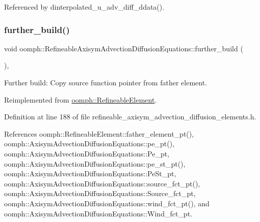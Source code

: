 Referenced by dinterpolated\+\_\+u\+\_\+adv\+\_\+diff\+\_\+ddata().

\mbox{\label{classoomph_1_1RefineableAxisymAdvectionDiffusionEquations_aefeb49794d8a5d79e59c9d2145e60795}} 
\subsubsection{\texorpdfstring{further\+\_\+build()}{further\_build()}}
{\footnotesize\ttfamily void oomph\+::\+Refineable\+Axisym\+Advection\+Diffusion\+Equations\+::further\+\_\+build (\begin{DoxyParamCaption}{ }\end{DoxyParamCaption})\hspace{0.3cm}{\ttfamily [inline]}, {\ttfamily [virtual]}}



Further build\+: Copy source function pointer from father element. 



Reimplemented from \hyperlink{classoomph_1_1RefineableElement_a26628ce36dfad028686adeb4694a9ef3}{oomph\+::\+Refineable\+Element}.



Definition at line 188 of file refineable\+\_\+axisym\+\_\+advection\+\_\+diffusion\+\_\+elements.\+h.



References oomph\+::\+Refineable\+Element\+::father\+\_\+element\+\_\+pt(), oomph\+::\+Axisym\+Advection\+Diffusion\+Equations\+::pe\+\_\+pt(), oomph\+::\+Axisym\+Advection\+Diffusion\+Equations\+::\+Pe\+\_\+pt, oomph\+::\+Axisym\+Advection\+Diffusion\+Equations\+::pe\+\_\+st\+\_\+pt(), oomph\+::\+Axisym\+Advection\+Diffusion\+Equations\+::\+Pe\+St\+\_\+pt, oomph\+::\+Axisym\+Advection\+Diffusion\+Equations\+::source\+\_\+fct\+\_\+pt(), oomph\+::\+Axisym\+Advection\+Diffusion\+Equations\+::\+Source\+\_\+fct\+\_\+pt, oomph\+::\+Axisym\+Advection\+Diffusion\+Equations\+::wind\+\_\+fct\+\_\+pt(), and oomph\+::\+Axisym\+Advection\+Diffusion\+Equations\+::\+Wind\+\_\+fct\+\_\+pt.

